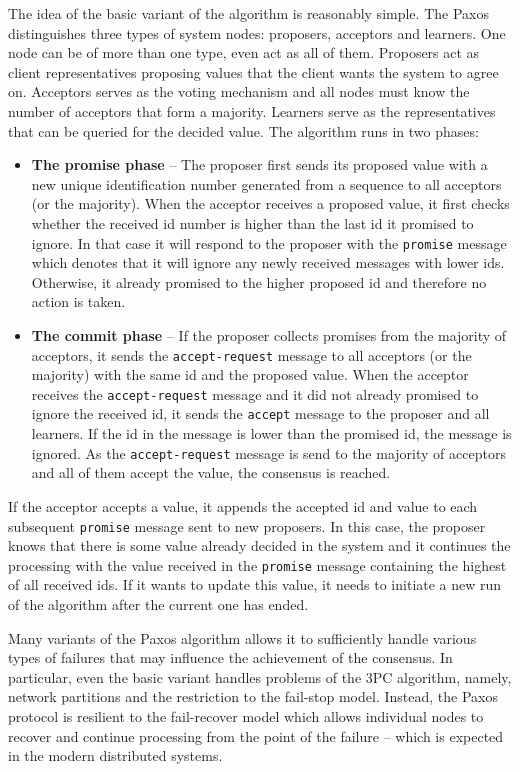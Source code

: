 \documentclass[oneside,
  digital, %
  table,   %
  nolof,     %
  nolot,     %
]{fithesis3}
\begin{document}
The idea of the basic variant of the algorithm is reasonably simple. The Paxos distinguishes three types of system nodes: proposers, acceptors and learners. One node can be of more than one type, even act as all of them. Proposers act as client representatives proposing values that the client wants the system to agree on. Acceptors serves as the voting mechanism and all nodes must know the number of acceptors that form a majority. Learners serve as the representatives that can be queried for the decided value. The algorithm runs in two phases:

\begin{itemize}
    \item \textbf{The promise phase} -- The proposer first sends its proposed value with a new unique identification number generated from a sequence to all acceptors (or the majority). When the acceptor receives a proposed value, it first checks whether the received id number is higher than the last id it promised to ignore. In that case it will respond to the proposer with the \texttt{promise} message which denotes that it will ignore any newly received messages with lower ids. Otherwise, it already promised to the higher proposed id and therefore no action is taken.
    
    \item \textbf{The commit phase} -- If the proposer collects promises from the majority of acceptors, it sends the \texttt{accept-request} message to all acceptors (or the majority) with the same id and the proposed value. When the acceptor receives the \texttt{accept-request} message and it did not already promised to ignore the received id, it sends the \texttt{accept} message to the proposer and all learners. If the id in the message is lower than the promised id, the message is ignored. As the \texttt{accept-request} message is send to the majority of acceptors and all of them accept the value, the consensus is reached.
\end{itemize}

If the acceptor accepts a value, it appends the accepted id and value to each subsequent \texttt{promise} message sent to new proposers. In this case, the proposer knows that there is some value already decided in the system and it continues the processing with the value received in the \texttt{promise} message containing the highest of all received ids. If it wants to update this value, it needs to initiate a new run of the algorithm after the current one has ended. 

Many variants of the Paxos algorithm allows it to sufficiently handle various types of failures that may influence the achievement of the consensus. In particular, even the basic variant handles problems of the 3PC algorithm, namely, network partitions and the restriction to the fail-stop model. Instead, the Paxos protocol is resilient to the fail-recover model which allows individual nodes to recover and continue processing from the point of the failure -- which is expected in the modern distributed systems.
\end{document}
